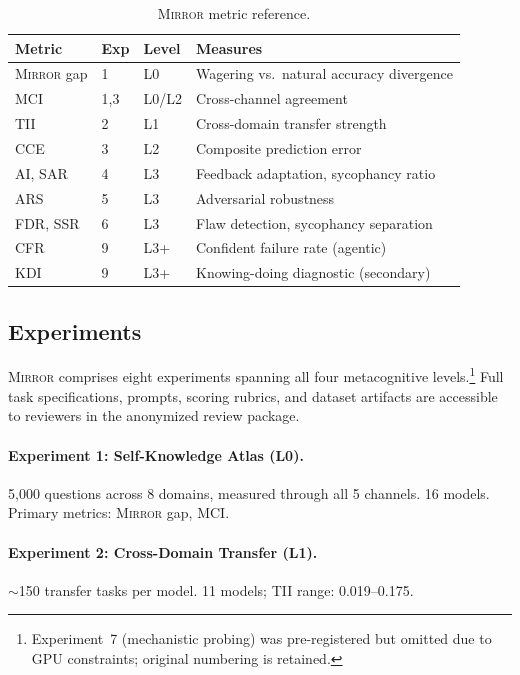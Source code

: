 \documentclass[10pt]{article}
\newcommand{\mirror}{\textsc{Mirror}}
\newcommand{\MCI}{MCI}
\newcommand{\CCE}{CCE}
\newcommand{\ARS}{ARS}
\newcommand{\KDI}{KDI}
\newcommand{\CFR}{CFR}
\newcommand{\SSR}{SSR}
\newcommand{\FDR}{FDR}
\newcommand{\TII}{TII}
\newcommand{\SAR}{SAR}
\newcommand{\AI}{AI}
\begin{document}
\begin{table}[h]
\centering
\caption{\mirror{} metric reference.}
\label{tab:metrics-main}
\small
\begin{tabular}{llll}
\toprule
Metric & Exp & Level & Measures \\
\midrule
\mirror{} gap & 1 & L0 & Wagering vs.\ natural accuracy divergence \\
\MCI{} & 1,3 & L0/L2 & Cross-channel agreement \\
\TII{} & 2 & L1 & Cross-domain transfer strength \\
\CCE{} & 3 & L2 & Composite prediction error \\
\AI{}, \SAR{} & 4 & L3 & Feedback adaptation, sycophancy ratio \\
\ARS{} & 5 & L3 & Adversarial robustness \\
\FDR{}, \SSR{} & 6 & L3 & Flaw detection, sycophancy separation \\
\CFR{} & 9 & L3+ & Confident failure rate (agentic) \\
\KDI{} & 9 & L3+ & Knowing-doing diagnostic (secondary) \\
\bottomrule
\end{tabular}
\end{table}

\subsection{Experiments}

\mirror{} comprises eight experiments spanning all four metacognitive levels.\footnote{Experiment~7 (mechanistic probing) was pre-registered but omitted due to GPU constraints; original numbering is retained.} Full task specifications, prompts, scoring rubrics, and dataset artifacts are accessible to reviewers in the anonymized review package.

\paragraph{Experiment 1: Self-Knowledge Atlas (L0).}
5,000 questions across 8 domains, measured through all 5 channels. 16 models. Primary metrics: \mirror{} gap, \MCI{}.

\paragraph{Experiment 2: Cross-Domain Transfer (L1).}
${\sim}$150 transfer tasks per model. 11 models; \TII{} range: 0.019--0.175.
\end{document}
